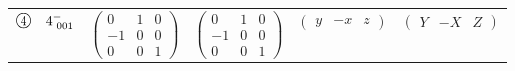 \documentclass[fleqn,10pt,landscape]{jsarticle}
\begin{document}
\begin{center}
\begin{longtable}{lcccc}
$ {\ooalign{\hfil\resizebox{.8\width}{\height}{4}\hfil\crcr\raise.1ex\hbox{\large$\bigcirc$}}}\quad 4^{-}_{\,\,001} $ & $ \begin{pmatrix} 0 & 1 & 0 \\ -1 & 0 & 0 \\ 0 & 0 & 1 \end{pmatrix} $ & $ \begin{pmatrix} 0 & 1 & 0 \\ -1 & 0 & 0 \\ 0 & 0 & 1 \end{pmatrix} $ & $ \begin{pmatrix} y & - x & z \end{pmatrix} $ & $ \begin{pmatrix} Y & - X & Z \end{pmatrix} $ \\
\end{longtable}
\end{center}
\newpage
\end{document}
